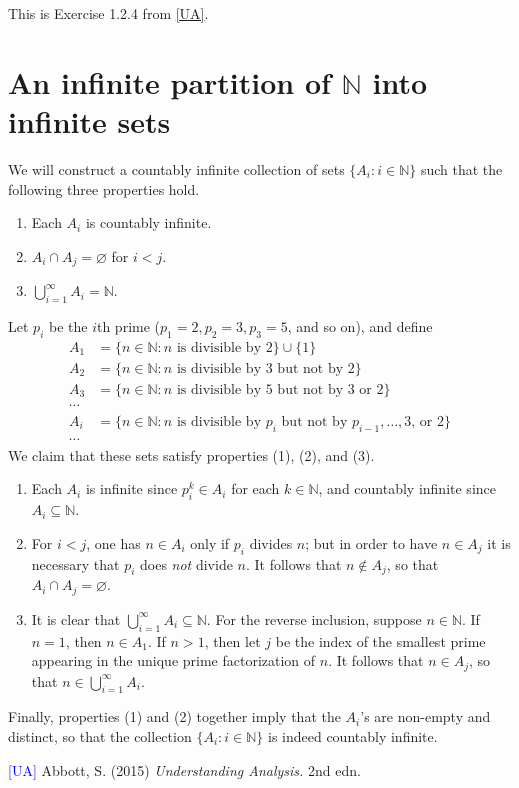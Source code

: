 \documentclass[12pt]{article}
\theoremstyle{definition}
\begin{document}
This is Exercise 1.2.4 from \hyperlink{ua}{[UA]}.

\section{An infinite partition of \texorpdfstring{\(\mathbb{N}\)}{} into infinite sets}

We will construct a countably infinite collection of sets \( \{ A_i : i \in \mathbb{N} \} \) such that the following three properties hold.
\begin{enumerate}[label = (\arabic*)]
    \item Each \( A_i \) is countably infinite.
    \item \( A_i \cap A_j = \varnothing \) for \( i < j \).
    \item \( \bigcup_{i=1}^{\infty} A_i = \mathbb{N} \).
\end{enumerate}

Let \( p_i \) be the \(i\)th prime (\( p_1 = 2, p_2 = 3, p_3 = 5 \), and so on), and define
\begin{align*}
    A_1 &= \{ n \in \mathbb{N} : n \text{ is divisible by 2} \} \cup \{ 1 \} \\
    A_2 &= \{ n \in \mathbb{N} : n \text{ is divisible by 3 but not by 2} \} \\
    A_3 &= \{ n \in \mathbb{N} : n \text{ is divisible by 5 but not by 3 or 2} \} \\
    \cdots & \\
    A_i &= \{ n \in \mathbb{N} : n \text{ is divisible by } p_i \text { but not by } p_{i-1}, \ldots, \text{3, or 2} \} \\
    \cdots &
\end{align*}
We claim that these sets satisfy properties (1), (2), and (3).
\begin{enumerate}[label = (\arabic*)]
    \item Each \( A_i \) is infinite since \( p_i^k \in A_i \) for each \( k \in \mathbb{N} \), and countably infinite since \( A_i \subseteq \mathbb{N} \).
    \item For \( i < j \), one has \( n \in A_i \) only if \( p_i \) divides \( n \); but in order to have \( n \in A_j \) it is necessary that \( p_i \) does \textit{not} divide \( n \). It follows that \( n \not\in A_j \), so that \( A_i \cap A_j = \varnothing \).
    \item It is clear that \( \bigcup_{i=1}^{\infty} A_i \subseteq \mathbb{N} \). For the reverse inclusion, suppose \( n \in \mathbb{N} \). If \( n = 1 \), then \( n \in A_1 \). If \( n > 1 \), then let \( j \) be the index of the smallest prime appearing in the unique prime factorization of \( n \). It follows that \( n \in A_j \), so that \( n \in \bigcup_{i=1}^{\infty} A_i \).
\end{enumerate}
Finally, properties (1) and (2) together imply that the \( A_i \)'s are non-empty and distinct, so that the collection \( \{ A_i : i \in \mathbb{N} \} \) is indeed countably infinite.



\hrulefill

\hypertarget{ua}{\textcolor{blue}{[UA]} Abbott, S. (2015) \textit{Understanding Analysis.} 2nd edn.}
\end{document}
